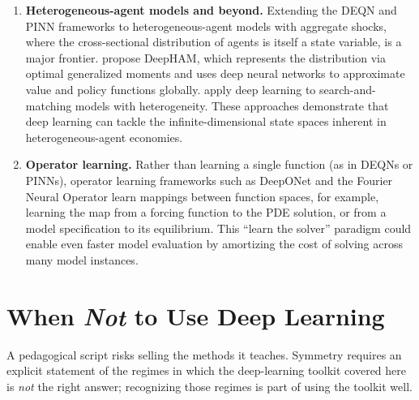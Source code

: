 \documentclass[11pt,a4paper]{report}
\begin{document}
\begin{enumerate}[itemsep=4pt]
\item \textbf{Heterogeneous-agent models and beyond.}  Extending the DEQN and PINN frameworks to heterogeneous-agent models with aggregate shocks, where the cross-sectional distribution of agents is itself a state variable, is a major frontier.  \citet{han2023deepham} propose DeepHAM, which represents the distribution via optimal generalized moments and uses deep neural networks to approximate value and policy functions globally.  \citet{payne2024deepsam} apply deep learning to search-and-matching models with heterogeneity.  These approaches demonstrate that deep learning can tackle the infinite-dimensional state spaces inherent in heterogeneous-agent economies.

\item \textbf{Operator learning.}  Rather than learning a single function (as in DEQNs or PINNs), operator learning frameworks such as DeepONet \citep{lu2021learning} and the Fourier Neural Operator \citep{li2021fourier} learn mappings between function spaces, for example, learning the map from a forcing function to the PDE solution, or from a model specification to its equilibrium.  This ``learn the solver'' paradigm could enable even faster model evaluation by amortizing the cost of solving across many model instances.
\end{enumerate}

\section{When \emph{Not} to Use Deep Learning}
\label{sec:when_not_to_use_dl}

A pedagogical script risks selling the methods it teaches.  Symmetry requires an explicit statement of the regimes in which the deep-learning toolkit covered here is \emph{not} the right answer; recognizing those regimes is part of using the toolkit well.
\end{document}
